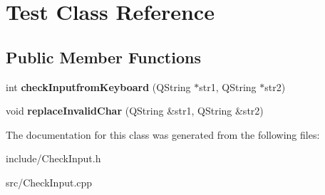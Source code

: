 \hypertarget{classTest}{}\section{Test Class Reference}
\label{classTest}
\subsection*{Public Member Functions}
\begin{DoxyCompactItemize}
\item 
\mbox{\label{classTest_a3b223ab01f34445e73b914b48a2ff7fc}} 
int {\bfseries check\+Inputfrom\+Keyboard} (Q\+String $\ast$str1, Q\+String $\ast$str2)
\item 
\mbox{\label{classTest_a83a0f09e6583bf623f84f0caa50342d9}} 
void {\bfseries replace\+Invalid\+Char} (Q\+String \&str1, Q\+String \&str2)
\end{DoxyCompactItemize}


The documentation for this class was generated from the following files\+:\begin{DoxyCompactItemize}
\item 
include/Check\+Input.\+h\item 
src/Check\+Input.\+cpp\end{DoxyCompactItemize}
